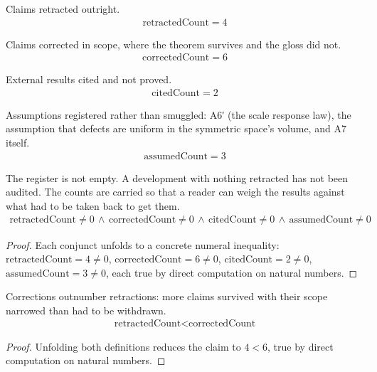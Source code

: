 \begin{definition}
Claims retracted outright.
\begin{align*}
\text{retractedCount} = 4
\end{align*}
\end{definition}

\begin{definition}
Claims corrected in scope, where the theorem survives and the gloss did not.
\begin{align*}
\text{correctedCount} = 6
\end{align*}
\end{definition}

\begin{definition}
External results cited and not proved.
\begin{align*}
\text{citedCount} = 2
\end{align*}
\end{definition}

\begin{definition}
Assumptions registered rather than smuggled: A6′ (the scale response law), the assumption that defects are uniform in the symmetric space's volume, and A7 itself.
\begin{align*}
\text{assumedCount} = 3
\end{align*}
\end{definition}

\begin{theorem}
The register is not empty.  A development with nothing retracted has not been audited.  The counts are carried so that a reader can weigh the results against what had to be taken back to get them.
\begin{align*}
\text{retractedCount} \neq 0 \,\wedge\, \text{correctedCount} \neq 0 \,\wedge\, \text{citedCount} \neq 0 \,\wedge\, \text{assumedCount} \neq 0
\end{align*}
\begin{proof}
Each conjunct unfolds to a concrete numeral inequality: $\text{retractedCount}=4\neq0$, $\text{correctedCount}=6\neq0$, $\text{citedCount}=2\neq0$, $\text{assumedCount}=3\neq0$, each true by direct computation on natural numbers.
\end{proof}
\end{theorem}

\begin{theorem}
Corrections outnumber retractions: more claims survived with their scope narrowed than had to be withdrawn.
\begin{align*}
\text{retractedCount} < \text{correctedCount}
\end{align*}
\begin{proof}
Unfolding both definitions reduces the claim to $4<6$, true by direct computation on natural numbers.
\end{proof}
\end{theorem}

